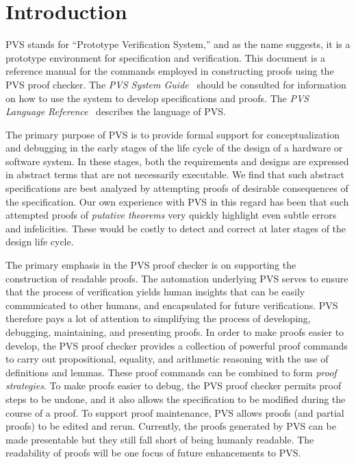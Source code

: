 \documentclass[12pt]{book}
\begin{document}
\tableofcontents
\cleardoublepage
{}
\setcounter{page}{1}

\chapter{Introduction}

PVS stands for ``Prototype Verification System,'' and as the name suggests,
it is a prototype environment for specification and verification.  This document is a
reference manual for the commands employed in constructing proofs using the
PVS proof checker.  The \emph{PVS System Guide}~\cite{PVS:userguide} should
be consulted for information on how to use the system to develop
specifications and proofs.  The \emph{PVS Language
Reference}~\cite{PVS:language} describes the language of PVS\@. 

The primary purpose of PVS is to provide formal support for
conceptualization and debugging in the early stages of the life cycle of
the design of a hardware or software system.  In these stages, both the
requirements and designs are expressed in abstract terms that are not
necessarily executable.  We find that such abstract specifications are
best analyzed by attempting proofs of desirable consequences of the
specification.  Our own experience with PVS in this regard has been that
such attempted proofs of \emph{putative theorems}
very quickly highlight even subtle errors and infelicities.  These would
be costly to detect and correct at later stages of the design life cycle.

The primary emphasis in the PVS proof checker is on supporting the
construction of readable proofs.  The  automation underlying
PVS serves to ensure that the process of verification yields human
insights that can be easily communicated to other humans, and
encapsulated for future verifications.  PVS therefore pays a lot of
attention to simplifying the process of developing, debugging,
maintaining, and presenting proofs.  In order to make proofs easier to
develop, the PVS proof checker provides a collection of powerful proof
commands to carry out propositional, equality, and arithmetic reasoning
with the use of definitions and lemmas.  These proof commands can be
combined to form \emph{proof strategies}.  To make proofs easier to
debug, the PVS proof checker permits proof steps to be undone, and it
also allows the specification to be modified during the course of a
proof.  To support proof maintenance, PVS allows proofs (and partial
proofs) to be edited and rerun.  Currently, the proofs generated by
PVS can be made presentable but they still fall short of being humanly
readable.   The readability of proofs will be one focus of future
enhancements to PVS\@.
\end{document}
